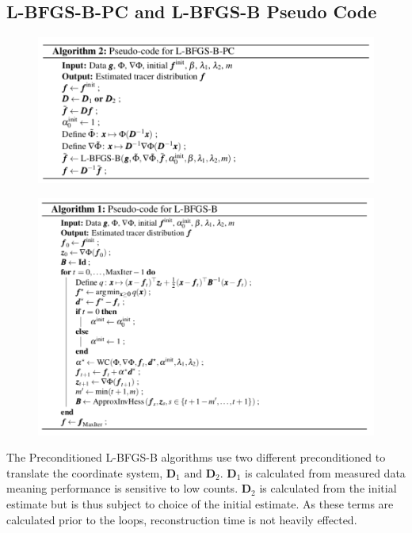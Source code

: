 \documentclass{article}
\begin{document}
\subsection{L-BFGS-B-PC and L-BFGS-B Pseudo Code}
\begin{figure}
	\centering
	\includegraphics[width = \linewidth]{Tsai's Thesis Analysis/L-BFGS-B-PC Pseudo Code.png}
    \caption{\label{Fig.L-BFGS-B-PC Pseudo Code}}
\end{figure}
\begin{figure}
	\centering
	\includegraphics[width = \linewidth]{Tsai's Thesis Analysis/L-BFGS-B Pseudo Code.png}
    \caption{\label{Fig.L-BFGS-B Pseudo Code}}
\end{figure}
The Preconditioned L-BFGS-B algorithms use two different preconditioned to translate the coordinate system, $\textbf{D}_1 \text{ and } \textbf{D}_2$. $\textbf{D}_1$ is calculated from measured data meaning performance is sensitive to low counts. $\textbf{D}_2$ is calculated from the initial estimate but is thus subject to choice of the initial estimate. As these terms are calculated prior to the loops, reconstruction time is not heavily effected.
\end{document}

